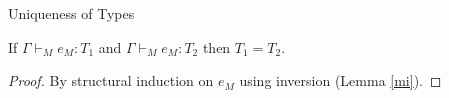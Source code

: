 \begin{muot}
\label{muot}
Uniqueness of Types

If $\Gamma\vdash_{M}e_{M}:T_{1}$ and $\Gamma\vdash_{M}e_{M}:T_{2}$ then $T_{1}=T_{2}$.
\begin{proof}
By structural induction on $e_{M}$ using inversion (Lemma \ref{mi}).
\end{proof}
\end{muot}